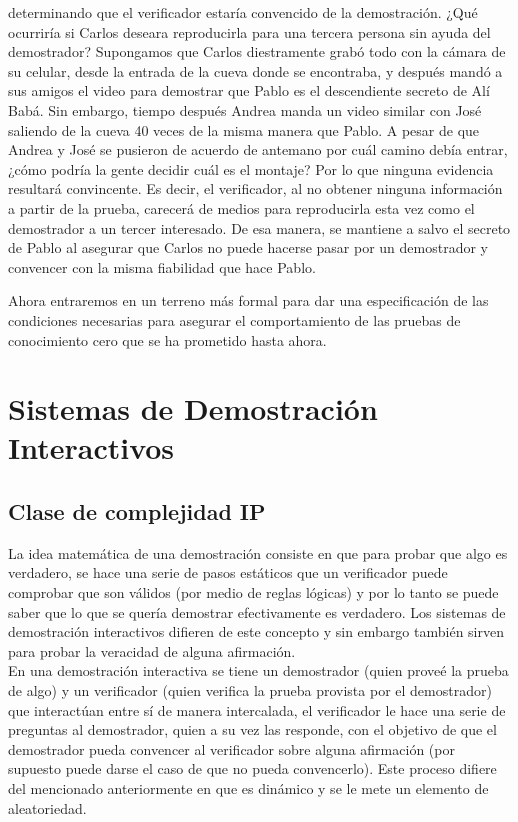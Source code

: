 \documentclass[oneside,10pt]{article}
\begin{document}
\begin{itemize}
  determinando que el verificador estaría convencido de la demostración. ¿Qué ocurriría si Carlos
  deseara reproducirla para una tercera persona sin ayuda del demostrador? Supongamos que Carlos
  diestramente
  grabó todo con la cámara de su celular, desde la entrada de la cueva donde se encontraba, y después
  mandó a sus amigos el video para demostrar que Pablo es el descendiente secreto de Alí Babá. Sin
  embargo, tiempo después Andrea manda un video similar con José saliendo de la cueva 40 veces de la
  misma manera que Pablo. A pesar de que Andrea y José se pusieron de acuerdo de antemano por cuál
  camino debía entrar, ¿cómo podría la gente decidir cuál es el montaje? Por lo que ninguna evidencia resultará convincente. Es decir, el verificador,
  al no obtener ninguna información a partir de la prueba, carecerá de medios para reproducirla esta vez
  como el demostrador a un tercer interesado. De esa manera, se mantiene a salvo el secreto de Pablo al asegurar que Carlos
  no puede hacerse pasar por un demostrador y convencer con la misma fiabilidad que hace Pablo.
\end{itemize}

Ahora entraremos en un terreno más formal para dar una especificación de las condiciones necesarias
para asegurar el comportamiento de las pruebas de conocimiento cero que se ha prometido hasta ahora.

\section{Sistemas de Demostración Interactivos}

\subsection{Clase de complejidad IP}
La idea matemática de una demostración consiste en que para probar que algo es verdadero, se hace una serie de pasos estáticos que un verificador puede comprobar que son válidos (por medio de reglas lógicas) y por lo tanto se puede saber que lo que se quería demostrar efectivamente es verdadero. Los sistemas de demostración interactivos difieren de este concepto y sin embargo también sirven para probar la veracidad de alguna afirmación. \\

En una demostración interactiva se tiene un demostrador (quien proveé la prueba de algo) y un verificador (quien verifica la prueba provista por el demostrador) que interactúan entre sí de manera intercalada, el verificador le hace una serie de preguntas al demostrador, quien a su vez las responde, con el objetivo de que el demostrador pueda convencer al verificador sobre alguna afirmación (por supuesto puede darse el caso de que no pueda convencerlo). Este proceso difiere del mencionado anteriormente en que es dinámico y se le mete un elemento de aleatoriedad. \\
\end{document}
